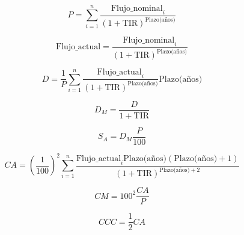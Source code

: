 \documentclass[10pt,a4paper]{article}
\begin{document}
	\[ P = \sum_{i=1}^{n} \dfrac{\text{Flujo\_nominal}_i}{(1+\text{TIR})^\text{Plazo(años)}} \]
	
	\[ \text{Flujo\_actual} = \dfrac{\text{Flujo\_nominal}_i}{(1+\text{TIR})^\text{Plazo(años)}} \]
	
	\[ D = \dfrac{1}{P} \sum_{i=1}^{n} \dfrac{\text{Flujo\_actual}_i}{(1+\text{TIR})^\text{Plazo(años)}} \text{Plazo(años)} \]
	
	\[ D_M = \dfrac{D}{1 + \text{TIR}} \]
	
	\[ S_A = D_M \dfrac{P}{100} \]
	
	\[ CA = \left(  \dfrac{1}{100} \right)^2 \sum_{i=1}^{n} \dfrac{\text{Flujo\_actual}_i \text{Plazo(años)} (\text{Plazo(años)} + 1)}{(1+\text{TIR})^{\text{Plazo(años)}+2}} \]
	
	
	\[ CM = 100^2 \dfrac{CA}{P} \]
	
	\[ CCC = \dfrac{1}{2} CA \]
\end{document}
